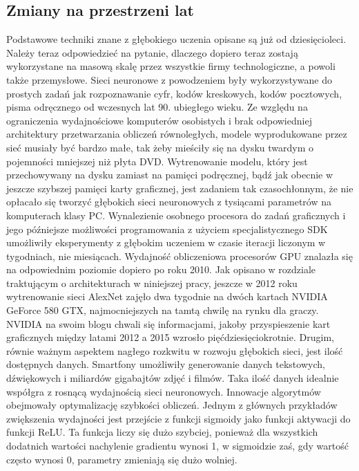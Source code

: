 \documentclass[12pt,a4paper,twoside,titlepage,openright]{book}
\begin{document}
\begin{itemize}
\begin{itemize}
\section{Zmiany na przestrzeni lat}
Podstawowe techniki znane z głębokiego uczenia opisane są już od dziesięcioleci. Należy teraz odpowiedzieć na pytanie, dlaczego dopiero teraz zostają wykorzystane na masową skalę przez wszystkie firmy technologiczne, a powoli także przemysłowe. Sieci neuronowe z powodzeniem były wykorzystywane do prostych zadań jak rozpoznawanie cyfr, kodów kreskowych, kodów pocztowych, pisma odręcznego od wczesnych lat 90. ubiegłego wieku. Ze względu na ograniczenia wydajnościowe komputerów osobistych i brak odpowiedniej architektury przetwarzania obliczeń równoległych, modele wyprodukowane przez sieć musiały być bardzo małe, tak żeby mieściły się na dysku twardym o pojemności mniejszej niż płyta DVD. Wytrenowanie modelu, który jest przechowywany na dysku zamiast na pamięci podręcznej, bądź jak obecnie w jeszcze szybszej pamięci karty graficznej, jest zadaniem tak czasochłonnym, że nie opłacało się tworzyć głębokich sieci neuronowych z tysiącami parametrów na komputerach klasy PC. Wynalezienie osobnego procesora do zadań graficznych i jego późniejsze możliwości programowania z użyciem specjalistycznego SDK umożliwiły eksperymenty z głębokim uczeniem w czasie iteracji liczonym w tygodniach, nie miesiącach. Wydajność obliczeniowa procesorów GPU znalazła się na odpowiednim poziomie dopiero po roku 2010. Jak opisano w rozdziale traktującym o architekturach w niniejszej pracy, jeszcze w 2012 roku wytrenowanie sieci AlexNet zajęło dwa tygodnie na dwóch kartach NVIDIA GeForce 580 GTX, najmocniejszych na tamtą chwilę na rynku dla graczy. NVIDIA na swoim blogu chwali się informacjami, jakoby przyspieszenie kart graficznych między latami 2012 a 2015 wzrosło pięćdziesięciokrotnie. \cite{siteNvidiaAcceleration} Drugim, równie ważnym aspektem nagłego rozkwitu w rozwoju głębokich sieci, jest ilość dostępnych danych. Smartfony umożliwiły generowanie danych tekstowych, dźwiękowych i miliardów gigabajtów zdjęć i filmów. Taka ilość danych idealnie współgra z rosnącą wydajnością sieci neuronowych. Innowacje algorytmów obejmowały optymalizację szybkości obliczeń. Jednym z głównych przykładów zwiększenia wydajności jest przejście z funkcji sigmoidy jako funkcji aktywacji do funkcji ReLU. Ta funkcja liczy się dużo szybciej, ponieważ dla wszystkich dodatnich wartości nachylenie gradientu wynosi 1, w sigmoidzie zaś, gdy wartość często wynosi 0, parametry zmieniają się dużo wolniej.


\end{itemize}
\end{itemize}
\end{document}
